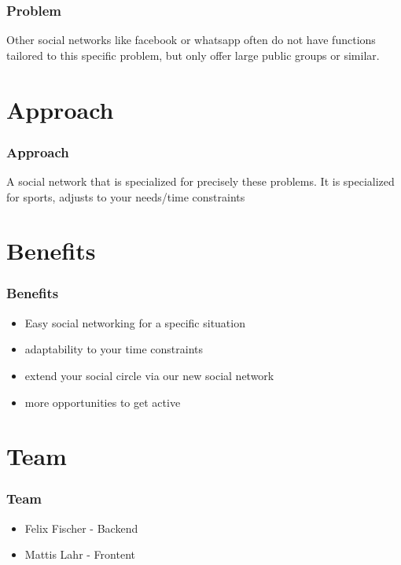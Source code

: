 \documentclass[aspectratio=169]{beamer}
\begin{document}
	\begin{frame}
		\frametitle{Problem}
		Other social networks like facebook or whatsapp often do not have functions tailored to this specific problem, but only offer large public groups or similar. 
	\end{frame}

\section{Approach}

	\begin{frame}
		\frametitle{Approach}
		A social network that is specialized for precisely these problems. It is specialized for sports, adjusts to your needs/time constraints 
	\end{frame}


\section{Benefits}

	\begin{frame}
		\frametitle{Benefits}
		\begin{itemize}
			\item Easy social networking for a specific situation
			\item adaptability to your time constraints
			\item extend your social circle via our new social network
			\item more opportunities to get active
		\end{itemize}
	\end{frame}

\section{Team}

	\begin{frame}
		\frametitle{Team}
		\begin{itemize}
			\item Felix Fischer - Backend 
			\item Mattis Lahr - Frontent
		\end{itemize}
	\end{frame}
\end{document}

